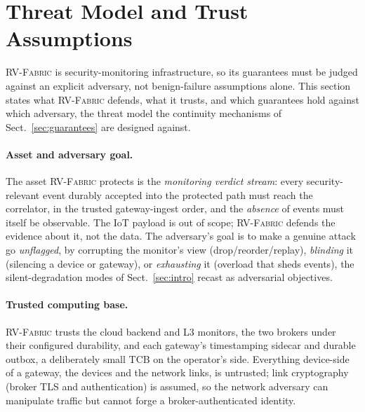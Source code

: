 \documentclass[runningheads]{llncs}
\newcommand{\sys}{\textsc{RV-Fabric}\xspace}
\begin{document}
\section{Threat Model and Trust Assumptions}
\label{sec:threatmodel}
\sys is security-monitoring infrastructure, so its guarantees must be judged against an
explicit adversary, not benign-failure assumptions alone. This section states what \sys
defends, what it trusts, and which guarantees hold against which adversary, the threat
model the continuity mechanisms of Sect.~\ref{sec:guarantees} are designed against.

\paragraph{Asset and adversary goal.}
The asset \sys protects is the \emph{monitoring verdict stream}: every
security-relevant event durably accepted into the protected path must reach the
correlator, in the trusted gateway-ingest order, and the \emph{absence} of events must
itself be observable. The IoT payload is out of scope; \sys defends the evidence about
it, not the data. The adversary's goal is to make a
genuine attack go \emph{unflagged}, by corrupting the monitor's view
(drop/reorder/replay), \emph{blinding} it (silencing a device or gateway), or
\emph{exhausting} it (overload that sheds events), the silent-degradation modes of
Sect.~\ref{sec:intro} recast as adversarial objectives.

\paragraph{Trusted computing base.}
\sys trusts the cloud backend and L3 monitors, the two brokers under their configured
durability, and each gateway's timestamping sidecar and durable outbox, a
deliberately small TCB on the operator's side. Everything device-side of a gateway,
the devices and the network links, is untrusted; link cryptography (broker TLS and
authentication) is assumed, so the network adversary can manipulate traffic but cannot
forge a broker-authenticated identity.
\end{document}
